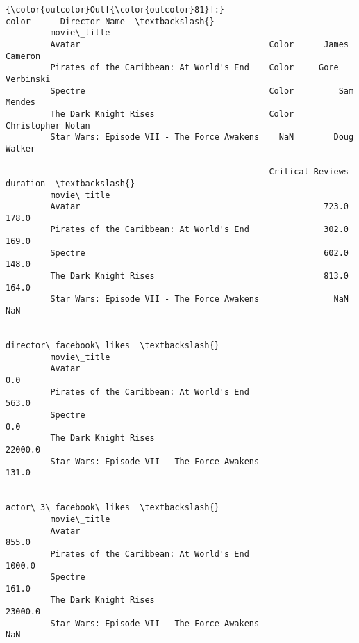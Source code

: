 \documentclass[11pt]{article}
\begin{document}
\begin{Verbatim}[commandchars=\\\{\}]
{\color{outcolor}Out[{\color{outcolor}81}]:}                                             color      Director Name  \textbackslash{}
         movie\_title                                                            
         Avatar                                      Color      James Cameron   
         Pirates of the Caribbean: At World's End    Color     Gore Verbinski   
         Spectre                                     Color         Sam Mendes   
         The Dark Knight Rises                       Color  Christopher Nolan   
         Star Wars: Episode VII - The Force Awakens    NaN        Doug Walker   
         
                                                     Critical Reviews  duration  \textbackslash{}
         movie\_title                                                              
         Avatar                                                 723.0     178.0   
         Pirates of the Caribbean: At World's End               302.0     169.0   
         Spectre                                                602.0     148.0   
         The Dark Knight Rises                                  813.0     164.0   
         Star Wars: Episode VII - The Force Awakens               NaN       NaN   
         
                                                     director\_facebook\_likes  \textbackslash{}
         movie\_title                                                           
         Avatar                                                          0.0   
         Pirates of the Caribbean: At World's End                      563.0   
         Spectre                                                         0.0   
         The Dark Knight Rises                                       22000.0   
         Star Wars: Episode VII - The Force Awakens                    131.0   
         
                                                     actor\_3\_facebook\_likes  \textbackslash{}
         movie\_title                                                          
         Avatar                                                       855.0   
         Pirates of the Caribbean: At World's End                    1000.0   
         Spectre                                                      161.0   
         The Dark Knight Rises                                      23000.0   
         Star Wars: Episode VII - The Force Awakens                     NaN   
         

\end{Verbatim}
\end{document}
